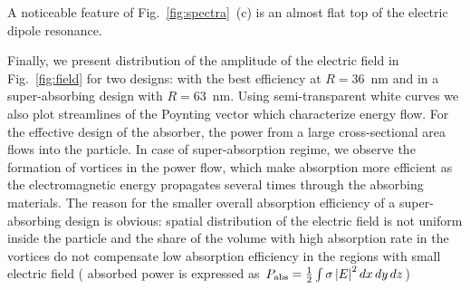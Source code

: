 \documentclass[aps,prl,twocolumn,showpacs,superscriptaddress,groupedaddress]{revtex4-1}
\begin{document}
A noticeable feature of Fig.~\ref{fig:spectra}~(c) is an almost flat
top of the electric dipole resonance.  

\begin{figure}
\end{figure}
Finally, we present distribution of the amplitude of the electric
field in Fig.~\ref{fig:field} for two designs: with the best
efficiency at $R=36$~nm and in a super-absorbing design with
$R=63$~nm.  Using semi-transparent white curves we also plot
streamlines of the Poynting vector which characterize energy flow.
For the effective design of the absorber, the power from a large
cross-sectional area flows into the particle.  In case of
super-absorption regime, we observe the formation of vortices in the
power flow, which make absorption more efficient as the
electromagnetic energy propagates several times through the absorbing
materials.  The reason for the smaller overall absorption efficiency
of a super-absorbing design is obvious: spatial distribution of the electric
field is not uniform inside the particle and the share of the volume
with high absorption rate in the vortices do not compensate low
absorption efficiency in the regions with small electric field (
absorbed power is expressed as $P_{\rm abs}=\frac{1}{2}\int\sigma
\left|E\right|^2dx\,dy\,dz$)
\end{document}
